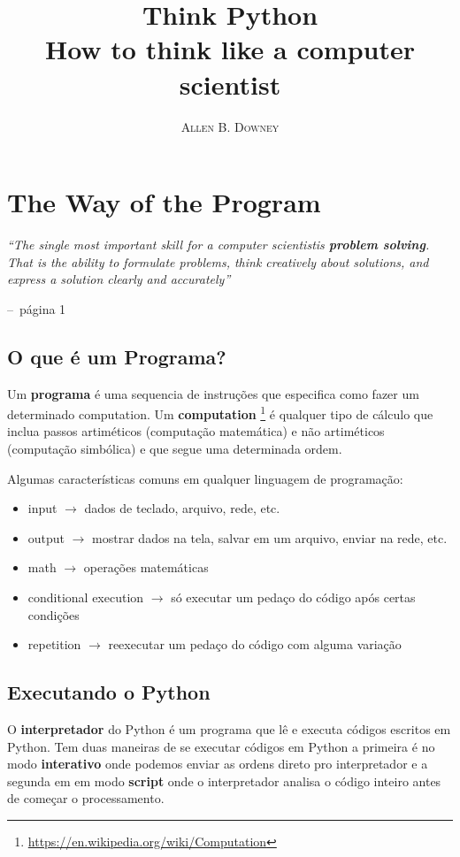 \documentclass[a4paper,11pt]{book}
\title{\Huge \textbf{Think Python}  \\ \huge How to think like a computer scientist }
\author{\textsc{Allen B. Downey}}
\makeatletter
\newenvironment{chapquote}[2][2em]
  {\setlength{\@tempdima}{#1}%
   \def\chapquote@author{#2}%
   \parshape 1 \@tempdima \dimexpr\textwidth-2\@tempdima\relax%
   \itshape}
  {\par\normalfont\hfill--\ \chapquote@author\hspace*{\@tempdima}\par\bigskip}
\makeatother
\begin{document}
\frontmatter
\maketitle

\tableofcontents

\mainmatter

\chapter{The Way of the Program}

\begin{chapquote}{página 1}
	``The single most important skill for a computer scientistis \textbf{problem solving}. That is the 
	ability to formulate problems, think creatively about solutions, and express a solution clearly and 
	accurately''
\end{chapquote}

\section{O que é um Programa?}
Um \textbf{programa} é uma sequencia de instruções que especifica como fazer um determinado computation. Um \textbf{computation}
\footnote{\href{https://en.wikipedia.org/wiki/Computation}{https://en.wikipedia.org/wiki/Computation}} é qualquer tipo de cálculo que inclua 
passos artiméticos (computação matemática) e não artiméticos (computação simbólica) e que segue uma determinada ordem. \par
Algumas características comuns em qualquer linguagem de programação:
\begin{itemize}
	\item input $\rightarrow$ dados de teclado, arquivo, rede, etc.
	\item output $\rightarrow$ mostrar dados na tela, salvar em um arquivo, enviar na rede, etc.
	\item math $\rightarrow$ operações matemáticas
	\item conditional execution $\rightarrow$ só executar um pedaço do código após certas condições
	\item repetition $\rightarrow$ reexecutar um pedaço do código com alguma variação
\end{itemize}

\section{Executando o Python}
O \textbf{interpretador} do Python é um programa que lê e executa códigos escritos em Python. Tem duas maneiras de se executar códigos em Python
a primeira é no modo \textbf{interativo} onde podemos enviar as ordens direto pro interpretador e a segunda em em modo \textbf{script} onde
o interpretador analisa o código inteiro antes de começar o processamento.
\end{document}
